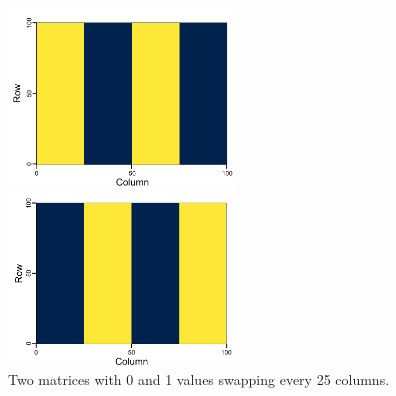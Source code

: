 \begin{figure}[htbp]
    \begin{minipage}[b]{0.45\linewidth}
      \centering
      \includegraphics[keepaspectratio, width=6.0cm]{figures/origi_spec/25stripe1.pdf}
    \end{minipage}
    \begin{minipage}[b]{0.45\linewidth}
      \centering
      \includegraphics[keepaspectratio, width=6.0cm]{figures/origi_spec/25stripe2.pdf}
    \end{minipage}
    \caption{Two matrices with 0 and 1 values swapping every 25 columns.}
    \label{fig:25stripe_spec}
\end{figure}

